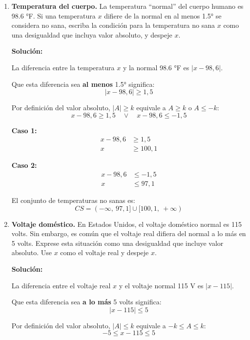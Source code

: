 \documentclass[12pt]{article}
\newcommand{\solucion}{%
    \vspace{0.8em}%
    \textbf{Solución:}%
}
\begin{document}
\begin{enumerate}[label=\alph*.-]

    \item \textbf{Temperatura del cuerpo.} La temperatura ``normal'' del cuerpo humano es 98.6 °F. Si una temperatura $x$ difiere de la normal en al menos 1.5° se considera no sana, escriba la condición para la temperatura no sana $x$ como una desigualdad que incluya valor absoluto, y despeje $x$.

    \solucion

    La diferencia entre la temperatura $x$ y la normal 98.6 °F es $|x - 98{,}6|$.

    Que esta diferencia sea \textbf{al menos} 1.5° significa:
    \[
    |x - 98{,}6| \geq 1{,}5
    \]

    Por definición del valor absoluto, $|A| \geq k$ equivale a $A \geq k$ o $A \leq -k$:
    \[
    x - 98{,}6 \geq 1{,}5 \quad \lor \quad x - 98{,}6 \leq -1{,}5
    \]

    \textbf{Caso 1:}
    \begin{align*}
    x - 98{,}6 &\geq 1{,}5 \\[0.3em]
    x &\geq 100{,}1
    \end{align*}

    \textbf{Caso 2:}
    \begin{align*}
    x - 98{,}6 &\leq -1{,}5 \\[0.3em]
    x &\leq 97{,}1
    \end{align*}

    El conjunto de temperaturas no sanas es:
    \[
    \boxed{CS = (-\infty,\ 97{,}1] \cup [100{,}1,\ +\infty)}
    \]

    \newpage
    \item \textbf{Voltaje doméstico.} En Estados Unidos, el voltaje doméstico normal es 115 volts. Sin embargo, es común que el voltaje real difiera del normal a lo más en 5 volts. Exprese esta situación como una desigualdad que incluye valor absoluto. Use $x$ como el voltaje real y despeje $x$.

    \solucion

    La diferencia entre el voltaje real $x$ y el voltaje normal 115 V es $|x - 115|$.

    Que esta diferencia sea \textbf{a lo más} 5 volts significa:
    \[
    |x - 115| \leq 5
    \]

    Por definición del valor absoluto, $|A| \leq k$ equivale a $-k \leq A \leq k$:
    \[
    -5 \leq x - 115 \leq 5
    \]


\end{enumerate}
\end{document}
